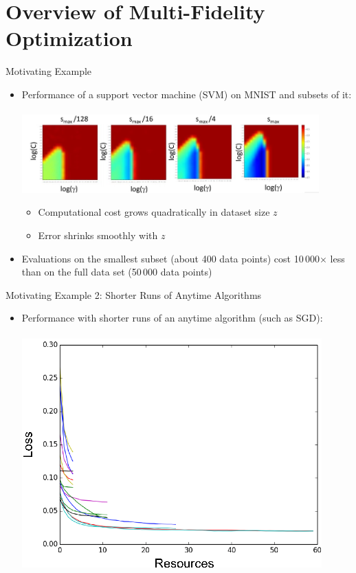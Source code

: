 \section{Overview of Multi-Fidelity Optimization}
\begin{frame}[c]{Motivating Example}

\begin{itemize}
    \item Performance of a support vector machine (SVM) on MNIST and subsets of it:\\~\\
	    \includegraphics[width=0.9\textwidth]{../w07_hpo_speedup/images/fabolas/example_mnist.jpg}
	    \begin{itemize}
            \item Computational cost grows quadratically in dataset size $z$
            \item Error shrinks smoothly with $z$
        \end{itemize}
\bigskip
    \item Evaluations on the smallest subset (about 400 data points) cost 10\,000$\times$ less than on the full data set (50\,000 data points)
    
\end{itemize}
\end{frame}

\begin{frame}[c]{Motivating Example 2: Shorter Runs of Anytime Algorithms}

\begin{itemize}
    \item Performance with shorter runs of an anytime algorithm (such as SGD):\\~\\
\centering
\includegraphics[width=0.5\linewidth]{../w07_hpo_speedup/images/hyperband/Figure_1_2.png}

\end{itemize}
\end{frame}


